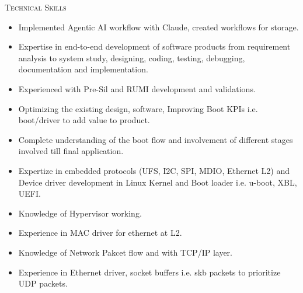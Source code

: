 \documentclass[10pt, a4paper]{article}
\newcommand{\MainHeading}[1]{%
    {\noindent \color{ltgrey}\normalsize{\textsc {#1}}}\vspace{2pt}}%
\begin{document}
\begin{minipage}[t]{0.66\textwidth}        %
  \MainHeading{Technical Skills}%
   \begin{itemize}[label={-}, topsep=0pt, partopsep=0pt, itemsep=0pt, parsep=0pt]
%
      \item \noindent Implemented Agentic AI workflow with Claude, created workflows for storage.
      \item \noindent Expertise in end-to-end development of software products from requirement analysis to system study,
       designing, coding, testing, debugging, documentation and implementation.
      \item \noindent Experienced with Pre-Sil and RUMI development and validations.
      \item \noindent Optimizing the existing design, software, Improving Boot KPIs i.e. boot/driver to add value to product.
      \item \noindent Complete understanding of the boot flow and involvement of different stages involved till final application.
%
      \item \noindent Expertize in embedded protocols (UFS, I2C, SPI, MDIO, Ethernet L2) and Device driver development in Linux Kernel and Boot loader i.e. u-boot, XBL, UEFI.
      \item \noindent Knowledge of Hypervisor working.
      \item \noindent Experience in MAC driver for ethernet at L2.
      \item \noindent Knowledge of Network Pakcet flow and with TCP/IP layer.
      \item \noindent Experience in Ethernet driver, socket buffers i.e. skb packets to prioritize UDP packets.

\end{itemize}
\end{minipage}
\end{document}

